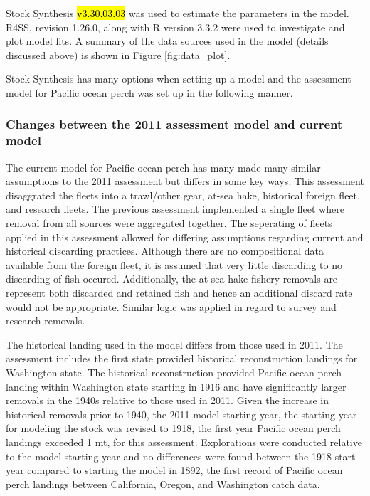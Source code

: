 \documentclass[12pt,]{article}
\begin{document}
Stock Synthesis \hl{v3.30.03.03} was used to estimate the parameters in
the model. R4SS, revision 1.26.0, along with R version 3.3.2 were used
to investigate and plot model fits. A summary of the data sources used
in the model (details discussed above) is shown in Figure
\ref{fig:data_plot}.

Stock Synthesis has many options when setting up a model and the
assessment model for Pacific ocean perch was set up in the following
manner.

\subsubsection{Changes between the 2011 assessment model and current
model}\label{changes-between-the-2011-assessment-model-and-current-model}

The current model for Pacific ocean perch has many made many similar
assumptions to the 2011 assessment but differs in some key ways. This
assessment disaggrated the fleets into a trawl/other gear, at-sea hake,
historical foreign fleet, and research fleets. The previous assessment
implemented a single fleet where removal from all sources were
aggregated together. The seperating of fleets applied in this assessment
allowed for differing assumptions regarding current and historical
discarding practices. Although there are no compositional data available
from the foreign fleet, it is assumed that very little discarding to no
discarding of fish occured. Additionally, the at-sea hake fishery
removals are represent both discarded and retained fish and hence an
additional discard rate would not be appropriate. Similar logic was
applied in regard to survey and research removals.

The historical landing used in the model differs from those used in
2011. The assessment includes the first state provided historical
reconstruction landings for Washington state. The historical
reconstruction provided Pacific ocean perch landing within Washington
state starting in 1916 and have significantly larger removals in the
1940s relative to those used in 2011. Given the increase in historical
removals prior to 1940, the 2011 model starting year, the starting year
for modeling the stock was revised to 1918, the first year Pacific ocean
perch landings exceeded 1 mt, for this assessment. Explorations were
conducted relative to the model starting year and no differences were
found between the 1918 start year compared to starting the model in
1892, the first record of Pacific ocean perch landings between
California, Oregon, and Washington catch data.
\end{document}
